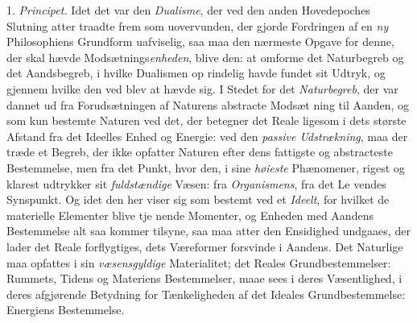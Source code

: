 1. \emph{Principet.} Idet det var den \emph{Dualisme}, der ved
den anden Hovedepoches Slutning atter traadte frem som
uovervunden, der gjorde Fordringen af en \emph{ny} Philosophiens
Grundform uafviselig, saa maa den nærmeste Opgave for denne,
der skal hævde Modsætnings\emph{enheden}, blive den: at omforme
 det Naturbegreb og det Aandsbegreb, i hvilke Dualismen op\-%
rindelig havde fundet sit Udtryk, og gjennem hvilke den ved\-%
blev at hævde sig. I Stedet for det \emph{Naturbegreb}, der var
dannet ud fra Forudsætningen af Naturens abstracte Modsæt\-%
ning til Aanden, og som kun bestemte Naturen ved det, der
betegner det Reale ligesom i dets største Afstand fra det
Ideelles Enhed og Energie: ved den \emph{passive Udstrækning},
maa der træde et Begreb, der ikke opfatter Naturen efter dens
fattigste og abstracteste Bestemmelse, men fra det Punkt, hvor
den, i sine \emph{høieste} Phænomener, rigest og klarest udtrykker
sit \emph{fuldstændige} Væsen: fra \emph{Organismens}, fra det Le\-%
vendes Synspunkt. Og idet den her viser sig som bestemt
ved et \emph{Ideelt}, for hvilket de materielle Elementer blive tje\-%
nende Momenter, og Enheden med Aandens Bestemmelse alt\-%
saa kommer tilsyne, saa maa atter den Ensidighed undgaaes,
der lader det Reale forflygtiges, dets Væreformer forsvinde i
Aandens. Det Naturlige maa opfattes i sin \emph{væsensgyldige}
Materialitet; det Reales Grundbestemmelser: Rummets, Tidens
og Materiens Bestemmelser, maae sees i deres Væsentlighed, i
deres afgjørende Betydning for Tænkeligheden af det Ideales
Grundbestemmelse: Energiens Bestemmelse.

